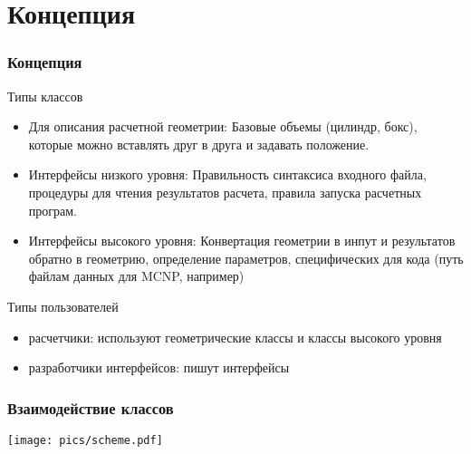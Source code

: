 \documentclass[t]{beamer}
\begin{document}
\section{Концепция}
\begin{frame}\frametitle{Концепция}
    \begin{block}{Типы классов}
        \begin{itemize}
            \item Для описания расчетной геометрии:
                  Базовые объемы (цилиндр, бокс), которые можно вставлять друг
                  в друга и задавать положение.

            \item Интерфейсы низкого уровня:
                  Правильность синтаксиса входного файла, процедуры для чтения
                  результатов расчета, правила запуска расчетных програм.

            \item Интерфейсы высокого уровня:
                  Конвертация геометрии в инпут и результатов обратно в
                  геометрию, определение параметров, специфических для кода
                  (путь файлам данных для MCNP, например)
        \end{itemize}
    \end{block}

    \begin{block}{Типы пользователей}
        \begin{itemize}
            \item расчетчики: используют геометрические классы и классы высокого уровня
            \item разработчики интерфейсов: пишут интерфейсы
        \end{itemize}
    \end{block}
\end{frame}
\begin{frame}\frametitle{Взаимодействие классов}
   
   \texttt{[image: pics/scheme.pdf]}

\end{frame}
\end{document}
